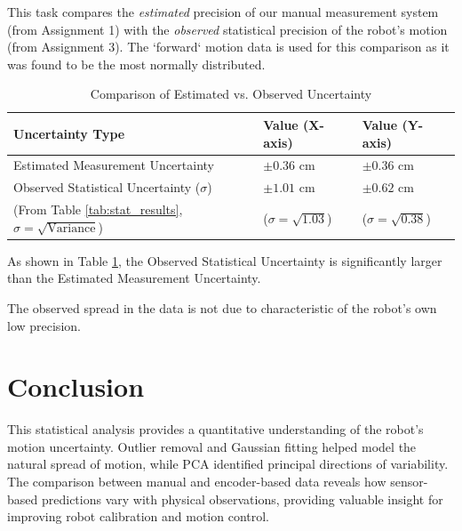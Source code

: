 This task compares the \textit{estimated} precision of our manual measurement system (from Assignment 1) with the \textit{observed} statistical precision of the robot's motion (from Assignment 3). The `forward` motion data is used for this comparison as it was found to be the most normally distributed.


\begin{table}[htbp]
\centering
\caption{Comparison of Estimated vs. Observed Uncertainty}
\label{tab:uncertainty}
\begin{tabular}{@{}lll@{}}
\toprule
\textbf{Uncertainty Type} & \textbf{Value (X-axis)} & \textbf{Value (Y-axis)} \\
\midrule
Estimated Measurement Uncertainty & $\pm 0.36$ cm & $\pm 0.36$ cm \\ 
\addlinespace
Observed Statistical Uncertainty ($\sigma$) & $\pm 1.01$ cm & $\pm 0.62$ cm \\
(From Table \ref{tab:stat_results}, $\sigma = \sqrt{\text{Variance}}$) & ($\sigma = \sqrt{1.03}$) & ($\sigma = \sqrt{0.38}$) \\
\bottomrule
\end{tabular}
\end{table}


As shown in Table \ref{tab:uncertainty}, the Observed Statistical Uncertainty is significantly larger than the Estimated Measurement Uncertainty. 

The observed spread in the data is not due to characteristic of the robot's own low precision.


\section{Conclusion}

This statistical analysis provides a quantitative understanding of the robot’s motion uncertainty. Outlier removal and Gaussian fitting helped model the natural spread of motion, while PCA identified principal directions of variability. The comparison between manual and encoder-based data reveals how sensor-based predictions vary with physical observations, providing valuable insight for improving robot calibration and motion control.



\onecolumn 

